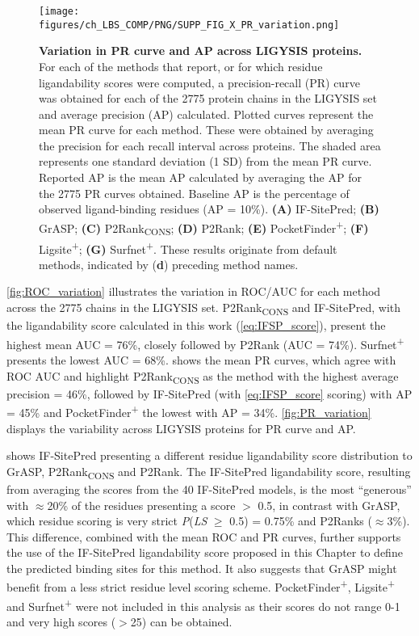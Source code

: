 \begin{figure}[htbp!]
    \centering
    \texttt{[image: figures/ch\_LBS\_COMP/PNG/SUPP\_FIG\_X\_PR\_variation.png]}
    \caption[Variation in PR curve and AP across LIGYSIS proteins]{\textbf{Variation in PR curve and AP across LIGYSIS proteins.} For each of the methods that report, or for which residue ligandability scores were computed, a precision-recall (PR) curve was obtained for each of the 2775 protein chains in the LIGYSIS set and average precision (AP) calculated. Plotted curves represent the mean PR curve for each method. These were obtained by averaging the precision for each recall interval across proteins. The shaded area represents one standard deviation (1 SD) from the mean PR curve. Reported AP is the mean AP calculated by averaging the AP for the 2775 PR curves obtained. Baseline AP is the percentage of observed ligand-binding residues (AP = 10\%). \textbf{(A)} IF-SitePred; \textbf{(B)} GrASP; \textbf{(C)} P2Rank\textsubscript{CONS}; \textbf{(D)} P2Rank; \textbf{(E)} PocketFinder\textsuperscript{+}; \textbf{(F)} Ligsite\textsuperscript{+}; \textbf{(G)} Surfnet\textsuperscript{+}. These results originate from default methods, indicated by (\textbf{d}) preceding method names.}
    \label{fig:PR_variation}
\end{figure}

\autoref{fig:ROC_variation} illustrates the variation in ROC/AUC for each method across the 2775 chains in the LIGYSIS set. P2Rank\textsubscript{CONS} and IF-SitePred, with the ligandability score calculated in this work (\autoref{eq:IFSP_score}), present the highest mean AUC = 76\%, closely followed by P2Rank (AUC = 74\%). Surfnet\textsuperscript{+} presents the lowest AUC = 68\%.  shows the mean PR curves, which agree with ROC AUC and highlight P2Rank\textsubscript{CONS} as the method with the highest average precision = 46\%, followed by IF-SitePred (with \autoref{eq:IFSP_score} scoring) with AP = 45\% and PocketFinder\textsuperscript{+} the lowest with AP = 34\%. \autoref{fig:PR_variation} displays the variability across LIGYSIS proteins for PR curve and AP.

\newpage

 shows IF-SitePred presenting a different residue ligandability score distribution to GrASP, P2Rank\textsubscript{CONS} and P2Rank. The IF-SitePred ligandability score, resulting from averaging the scores from the 40 IF-SitePred models, is the most ``generous'' with $\approx$20\% of the residues presenting a score $>$ 0.5, in contrast with GrASP, which residue scoring is very strict \textit{P}(\textit{LS} $\geq$ 0.5) = 0.75\% and P2Ranks ($\approx$3\%). This difference, combined with the mean ROC and PR curves, further supports the use of the IF-SitePred ligandability score proposed in this Chapter to define the predicted binding sites for this method. It also suggests that GrASP might benefit from a less strict residue level scoring scheme. PocketFinder\textsuperscript{+}, Ligsite\textsuperscript{+} and Surfnet\textsuperscript{+} were not included in this analysis as their scores do not range 0-1 and very high scores ($>$25) can be obtained.

